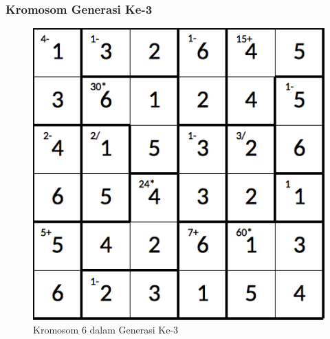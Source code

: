 \documentclass{beamer}
\begin{document}
\note{

}

\begin{frame}
\frametitle{Kromosom Generasi Ke-3}
\begin{figure}
\centering
\captionsetup{justification=centering}
\includegraphics[scale=0.333]{Gambar/hybridgenetic/Generation3Chromosome6}
\caption[Kromosom 6 dalam Generasi Ke-3]{Kromosom 6 dalam Generasi Ke-3}
\label{fig:analisisg3k6}
\end{figure}
\end{frame}

\note{

}
\end{document}

